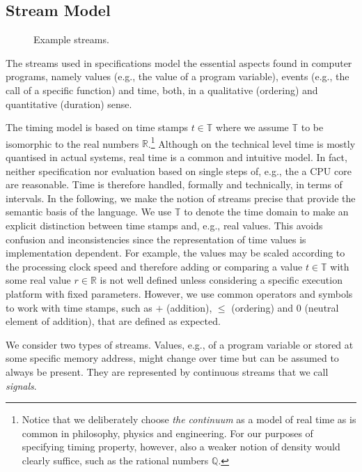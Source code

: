 \subsection{Stream Model}
\label{sec:streams}

\begin{figure}
  
  \caption{Example streams.\label{fig:streams}}
\end{figure}

The streams used in \tessla specifications model the essential aspects found in computer programs, namely values (e.g., the value of a program variable), events (e.g., the call of a specific function) and time, both, in a qualitative (ordering) and quantitative (duration) sense.

The timing model is based on time stamps $t∈𝕋$ where we assume $𝕋$ to be isomorphic to the real numbers $ℝ$.\footnote{Notice that we deliberately choose \emph{the continuum} as a model of real time as is common in philosophy, physics and engineering. For our purposes of specifying timing property, however, also a weaker notion of density would clearly suffice, such as the rational numbers $ℚ$.}
Although on the technical level time is mostly quantised in actual systems, real time is a common and intuitive model.
In fact, neither specification nor evaluation based on single steps of, e.g., the a CPU core are reasonable.
Time is therefore handled, formally and technically, in terms of intervals.
In the following, we make the notion of streams precise that provide the semantic basis of the language.
We use $𝕋$ to denote the time domain to make an explicit distinction between time stamps and, e.g., real values.
This avoids confusion and inconsistencies since the representation of time values is implementation dependent.
For example, the values may be scaled according to the processing clock speed and therefore adding or comparing a value $t∈𝕋$ with some real value $r∈ℝ$ is not well defined unless considering a specific execution platform with fixed parameters.
However, we use common operators and symbols to work with time stamps, such as $+$ (addition), $≤$ (ordering) and $0$ (neutral element of addition), that are defined as expected.

We consider two types of streams.
Values, e.g., of a program variable or stored at some specific memory address, might change over time but can be assumed to always be present.
They are represented by continuous streams that we call \emph{signals}. 

